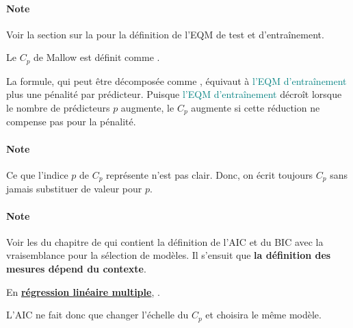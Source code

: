 \documentclass[french]{article}
\begin{document}
\begin{multicols*}{2}
\paragraph{Note}	Voir la section sur la \textit{\underline{}} pour la définition de l'EQM de test et d'entraînement.

\bigskip

\begin{definitionNOHFILL}[$C_{p}$ de Mallow]
Le $C_{p}$ de Mallow est définit comme . 

\bigskip

La formule, qui peut être décomposée comme , équivaut à \textcolor{teal}{l'EQM d'entraînement} plus \textcolor{amethyst}{une pénalité par prédicteur}. Puisque \textcolor{teal}{l'EQM d'entraînement} décroît lorsque le nombre de prédicteurs $p$ augmente, le $C_{p}$ augmente si cette réduction ne compense pas pour \textcolor{amethyst}{la pénalité}.

\paragraph{Note}	Ce que l'indice $p$ de $C_{p}$ représente n'est pas clair. Donc, on écrit toujours $C_{p}$ sans jamais substituer de valeur pour $p$.
\end{definitionNOHFILL}

\paragraph{Note}	Voir les \textit{\underline{}} du chapitre de \textit{\underline{}} qui contient la définition de l'AIC et du BIC avec la vraisemblance pour la sélection de modèles. Il s'ensuit que \textbf{la définition des mesures dépend du contexte}.

\bigskip

\begin{definitionNOHFILL}
En \textbf{\underline{régression linéaire multiple}}, . 

\bigskip

L'AIC ne fait donc que \textcolor{burntorange}{changer l'échelle} du $C_{p}$ et choisira le même modèle.
\end{definitionNOHFILL}



\end{multicols*}
\end{document}
